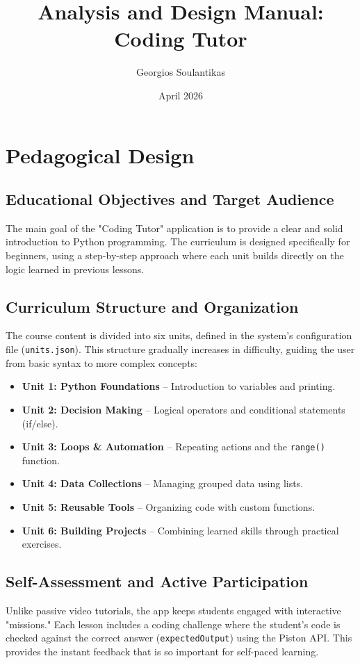 \documentclass[12pt]{report}
\title{Analysis and Design Manual: Coding Tutor}
\author{Georgios Soulantikas}
\date{April 2026}
\begin{document}
\maketitle
\tableofcontents

\chapter{Pedagogical Design}

\section{Educational Objectives and Target Audience}
The main goal of the "Coding Tutor" application is to provide a clear and solid introduction to Python programming. The curriculum is designed specifically for beginners, using a step-by-step approach where each unit builds directly on the logic learned in previous lessons. 

\section{Curriculum Structure and Organization}
The course content is divided into six units, defined in the system's configuration file (\texttt{units.json}). This structure gradually increases in difficulty, guiding the user from basic syntax to more complex concepts:

\begin{itemize}
    \item \textbf{Unit 1: Python Foundations} – Introduction to variables and printing.
    \item \textbf{Unit 2: Decision Making} – Logical operators and conditional statements (if/else).
    \item \textbf{Unit 3: Loops \& Automation} – Repeating actions and the \texttt{range()} function.
    \item \textbf{Unit 4: Data Collections} – Managing grouped data using lists.
    \item \textbf{Unit 5: Reusable Tools} – Organizing code with custom functions.
    \item \textbf{Unit 6: Building Projects} – Combining learned skills through practical exercises.
\end{itemize}

\section{Self-Assessment and Active Participation}
Unlike passive video tutorials, the app keeps students engaged with interactive "missions." Each lesson includes a coding challenge where the student's code is checked against the correct answer (\texttt{expectedOutput}) using the Piston API. This provides the instant feedback that is so important for self-paced learning.
\end{document}
